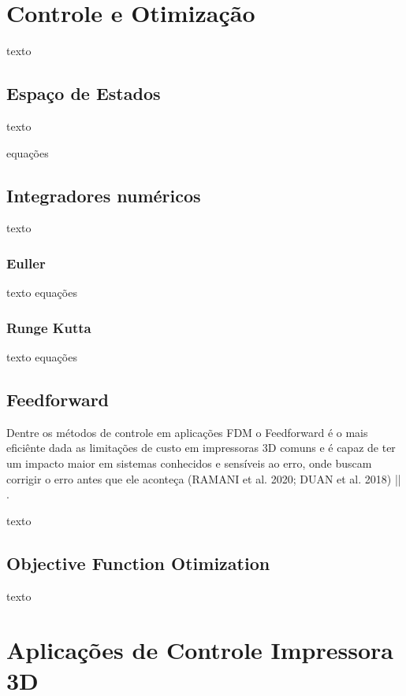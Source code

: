 \section{Controle e Otimização}

texto

\subsection{Espaço de Estados}
texto

equações

\subsection{Integradores numéricos}

texto

\subsubsection{Euller}
texto equações


\subsubsection{Runge Kutta}
texto
equações

\subsection{Feedforward}
Dentre os métodos de controle em aplicações FDM o Feedforward 
é o mais eficiênte dada as limitações de custo em impressoras 
3D comuns e é capaz de ter um impacto maior em sistemas 
conhecidos e sensíveis ao erro, onde buscam corrigir o erro 
antes que ele aconteça (RAMANI et al. 2020; DUAN et al. 2018) || \cite{ramani20}\cite{duan18}.

texto

\subsection{Objective Function Otimization}
texto

\section{Aplicações de Controle Impressora 3D}

